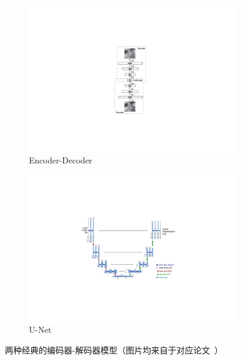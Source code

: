 
\begin{figure}[h!] %
	\centering
	\begin{subfigure}{0.22\textwidth}
		\centering
		\includegraphics[width=1.0\textwidth]{figure/popular_encoder_decoder_original_encoder_encoder}
		\caption{Encoder-Decoder~\cite{hinton2006reducing}}
	\end{subfigure}
	\qquad
	\begin{subfigure}{0.71\textwidth}
		\centering
		\includegraphics[width=1.0\textwidth]{figure/popular_encoder_decoder_unet}
		\caption{U-Net~\cite{ronneberger2015u}}
		\label{subfig:popular_encoder_decoder_unet}
	\end{subfigure}
	\caption{两种经典的编码器-解码器模型（图片均来自于对应论文~\cite{hinton2006reducing, ronneberger2015u}）} 
	\label{mulfig:popular_encoder_decoder}
\end{figure}

